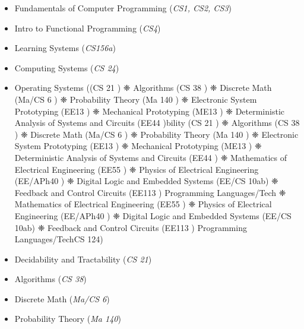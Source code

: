 \documentclass[letterpaper,10pt]{article}
\begin{document}
    \setlength{\columnsep}{0pt}
     \begin{multicols}{2}
        \begin{itemize}
            \setlength\itemsep{0pt}
            \item[\ding{104}] Fundamentals of Computer Programming (\textit{CS1, CS2, CS3})
            \item[\ding{104}] Intro to Functional Programming (\textit{CS4})
            \item[\ding{104}] Learning Systems (\textit{CS156a})
            \item[\ding{104}] Computing Systems (\textit{CS 24})
            \item[\ding{104}] Operating Systems (\textitbility (CS 21 )
❈ Algorithms (CS 38 )
❈ Discrete Math (Ma/CS 6 )
❈ Probability Theory (Ma 140 )
❈ Electronic System Prototyping (EE13 )
❈ Mechanical Prototyping (ME13 )
❈ Deterministic Analysis of Systems and
Circuits (EE44 )bility (CS 21 )
❈ Algorithms (CS 38 )
❈ Discrete Math (Ma/CS 6 )
❈ Probability Theory (Ma 140 )
❈ Electronic System Prototyping (EE13 )
❈ Mechanical Prototyping (ME13 )
❈ Deterministic Analysis of Systems and
Circuits (EE44 )
❈ Mathematics of Electrical Engineering (EE55 )
❈ Physics of Electrical Engineering
(EE/APh40 )
❈ Digital Logic and Embedded Systems
(EE/CS 10ab)
❈ Feedback and Control Circuits (EE113 )
Programming Languages/Tech
❈ Mathematics of Electrical Engineering (EE55 )
❈ Physics of Electrical Engineering
(EE/APh40 )
❈ Digital Logic and Embedded Systems
(EE/CS 10ab)
❈ Feedback and Control Circuits (EE113 )
Programming Languages/Tech{CS 124})
            \item[\ding{104}] Decidability and Tractability ({\textit{CS 21}})
            \item[\ding{104}] Algorithms (\textit{CS 38}) 
            \item[\ding{104}] Discrete Math (\textit{Ma/CS 6})
            \item[\ding{104}] Probability Theory (\textit{Ma 140})

        \end{itemize}

        \begin{itemize}
            
            \setlength\itemsep{-0.1em}


\end{itemize}
\end{multicols}
\end{document}
